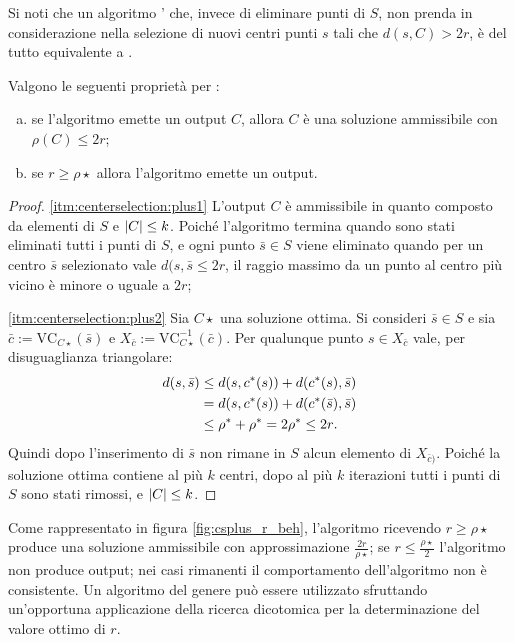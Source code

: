 Si noti che un algoritmo \CenterSelectionPlus' che, invece di eliminare punti di $S$, non prenda in considerazione nella selezione di nuovi centri punti $s$ tali che $d(s,C)>2r$, è del tutto equivalente a \CenterSelectionPlus.
\begin{theorem}
	Valgono le seguenti proprietà per \CenterSelectionPlus:
	\begin{enumerate}[(a)]
		\item \label{itm:centerselection:plus1} se l'algoritmo emette un output $C$, allora $C$ è una soluzione ammissibile con $\rho(C)\leq 2r$;
		\item \label{itm:centerselection:plus2} se $r\geq\rho\star$ allora l'algoritmo emette un output.
	\end{enumerate}
\end{theorem}
\begin{proof}
	\ref{itm:centerselection:plus1} L'output $C$ è ammissibile in quanto composto da elementi di $S$ e $\card C\leq k$. Poiché l'algoritmo termina quando sono stati eliminati tutti i punti di $S$, e ogni punto $\bar s\in S$ viene eliminato quando per un centro $\bar s$ selezionato vale $d(s,\bar s\leq 2r$, il raggio massimo da un punto al centro più vicino è minore o uguale a $2r$;

	\ref{itm:centerselection:plus2} Sia $C\star$ una soluzione ottima. Si consideri $\bar s\in S$ e sia $\bar c:=\text{VC}_{C\star}(\bar s)$ e $X_{\bar c}:=\text{VC}_{C\star}^{-1}(\bar c)$.
	Per qualunque punto $s\in X_{\bar c}$ vale, per disuguaglianza triangolare:
	\begin{align*}
		d(s,\bar s) & \leq d(s,c\star(s))+d(c\star(s),\bar s)                \\
		            & = d(s,c\star(s))+d(c\star(\bar s),\bar s)              \\
		            & \leq \rho\star + \rho\star = 2\rho\star \leq 2r \text.
	\end{align*}
	Quindi dopo l'inserimento di $\bar s$ non rimane in $S$ alcun elemento di $X_{\bar c)}$. Poiché la soluzione ottima contiene al più $k$ centri, dopo al più $k$ iterazioni tutti i punti di $S$ sono stati rimossi, e $\card C\leq k$.
\end{proof}


Come rappresentato in figura \ref{fig:csplus_r_beh}, l'algoritmo ricevendo $r\geq\rho\star$ produce una soluzione ammissibile con approssimazione $\frac{2r}{\rho\star}$; se $r\leq\frac{\rho\star}{2}$ l'algoritmo non produce output; nei casi rimanenti il comportamento dell'algoritmo non è consistente.
Un algoritmo del genere può essere utilizzato sfruttando un'opportuna applicazione della ricerca dicotomica per la determinazione del valore ottimo di $r$.

